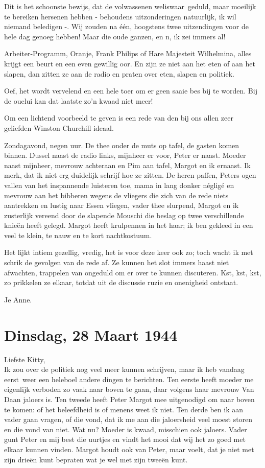 \documentclass{book}
\begin{document}
Dit is het schoonste bewijs, dat de volwassenen weliswaar~geduld, maar moeilijk
te bereiken hersenen hebben - behoudens uitzonderingen natuurlijk, ik wil
niemand beledigen -. Wij zouden na één, hoogstens twee uitzendingen voor de hele
dag genoeg hebben! Maar die oude ganzen, en n, ik zei immers al!

Arbeiter-Programm, Oranje, Frank Philips of Hare Majesteit Wilhelmina, alles
krijgt een beurt en een even gewillig oor. En zijn ze niet aan het eten of aan
het slapen, dan zitten ze aan de radio en praten over eten, slapen en politiek.

Oef, het wordt vervelend en een hele toer om er geen saaie bes bij te worden.
Bij de ouelui kan dat laatste zo'n kwaad niet meer!

Om een lichtend voorbeeld te geven is een rede van den bij ons allen zeer
geliefden Winston Churchill ideaal.

Zondagavond, negen uur. De thee onder de muts op tafel, de gasten komen binnen.
Dussel naast de radio links, mijnheer er voor, Peter er naast.  Moeder naast
mijnheer, mevrouw achteraan en Pim aan tafel, Margot en ik ernaast. Ik merk, dat
ik niet erg duidelijk schrijf hoe ze zitten. De heren paffen, Peters ogen vallen
van het inspannende luisteren toe, mama in lang donker négligé en mevrouw aan
het bibberen wegens de vliegers die zich van de rede niets aantrekken en lustig
naar Essen vliegen, vader thee slurpend, Margot en ik zusterlijk vereend door de
slapende Mouschi die beslag op twee verschillende knieën heeft gelegd. Margot
heeft krulpennen in het haar; ik ben gekleed in een veel te klein, te nauw en te
kort nachtkostuum.

Het lijkt intiem gezellig, vredig, het is voor deze keer ook zo; toch wacht ik
met schrik de gevolgen van de rede af. Ze kunnen het slot immers haast niet
afwachten, trappelen van ongeduld om er over te kunnen discuteren. Kst, kst,
kst, zo prikkelen ze elkaar, totdat uit de discussie ruzie en onenigheid
ontstaat.

Je Anne.

\section*{Dinsdag, 28 Maart 1944}

Liefste Kitty,\\
Ik zou over de politiek nog veel meer kunnen schrijven, maar ik
heb vandaag eerst~weer een heleboel andere dingen te berichten.  Ten eerste
heeft moeder me eigenlijk verboden zo vaak naar boven te gaan, daar volgens haar
mevrouw Van Daan jaloers is. Ten tweede heeft Peter Margot mee uitgenodigd om
naar boven te komen: of het beleefdheid is of menens weet ik niet. Ten derde ben
ik aan vader gaan vragen, of die vond, dat ik me aan die jaloersheid veel moest
storen en die vond van niet. Wat nu? Moeder is kwaad, misschien ook jaloers.
Vader gunt Peter en mij best die uurtjes en vindt het mooi dat wij het zo goed
met elkaar kunnen vinden. Margot houdt ook van Peter, maar voelt, dat je niet
met zijn drieën kunt bepraten wat je wel met zijn tweeën kunt.
\end{document}
